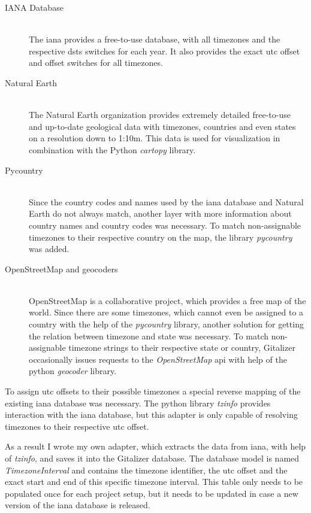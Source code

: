 \begin{description}
    \item[IANA Database] \hfill \\
    The \ac{iana} provides a free-to-use database, with all timezones and the respective \acp{dst} switches for each year.
    It also provides the exact \ac{utc} offset and offset switches for all timezones.

    \item[Natural Earth] \hfill \\
    The Natural Earth organization provides extremely detailed free-to-use and up-to-date geological data with timezones, countries and even states on a resolution down to 1:10m.
    This data is used for visualization in combination with the Python \emph{cartopy} library.

    \item[Pycountry] \hfill \\
    Since the country codes and names used by the \ac{iana} database and Natural Earth do not always match, another layer with more information about country names and country codes was necessary.
    To match non-assignable timezones to their respective country on the map, the library \emph{pycountry} was added.

    \item[OpenStreetMap and geocoders] \hfill \\
    OpenStreetMap is a collaborative project, which provides a free map of the world.
    Since there are some timezones, which cannot even be assigned to a country with the help of the \emph{pycountry} library, another solution for getting the relation between timezone and state was necessary.
    To match non-assignable timezone strings to their respective state or country, Gitalizer occasionally issues requests to the \emph{OpenStreetMap} \ac{api} with help of the python \emph{geocoder} library.

\end{description}

To assign \ac{utc} offsets to their possible timezones a special reverse mapping of the existing \ac{iana} database was necessary.
The python library \emph{tzinfo} provides interaction with the \ac{iana} database, but this adapter is only capable of resolving timezones to their respective \ac{utc} offset.

As a result I wrote my own adapter, which extracts the data from \ac{iana}, with help of \emph{tzinfo}, and saves it into the Gitalizer database.
The database model is named \emph{TimezoneInterval} and contains the timezone identifier, the \ac{utc} offset and the exact start and end of this specific timezone interval.
This table only needs to be populated once for each project setup, but it needs to be updated in case a new version of the \ac{iana} database is released.


